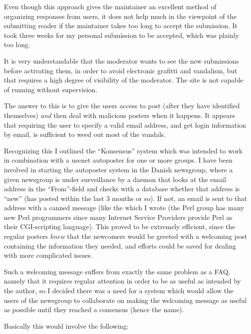 Even though this approach gives the maintainer an excellent method of
organizing responses from users, it does not help much in the
viewpoint of the submitting reader if the maintainer takes too long to
accept the submission.  It took three weeks for my personal
submission to be accepted, which was plainly too long.

It is very understandable that the moderator wants to see the new
submissions before activating them, in order to avoid electronic
grafitti and vandalism, but that requires a high degree of visibility
of the moderator.  The site is not capable of running without
supervision.

The answer to this is to give the users access to post (after they
have identified themselves) \textit{and} then deal with malicious
posters when it happens.  It appears that requiring the user to
specify a valid email address, and get login information by email, is
sufficient to weed out most of the vandals.

Recognizing this I outlined the ``Konsensus'' system which was
intended to work in combination with a usenet autoposter for one or
more groups.  I have been involved in starting the autoposter system
in the Danish newsgroup, where a given newsgroup is under surveillance
by a daemon that looks at the email address in the ``From''-field and
checks with a database whether that address is ``new'' (has posted
within the last 3 months or so).  If not, an email is sent to that
address with a canned message (like the
 which I wrote (the Perl group has many new Perl programmers
since many Internet Service Providers provide Perl as their
CGI-scripting language).  This proved to be extremely efficient, since
the regular posters \textit{knew} that the newcomers would be greeted
with a welcoming post containing the information they needed, and
efforts could be saved for dealing with more complicated issues.

Such a welcoming message suffers from exactly the same problem as a
FAQ, namely that it requires regular attention in order to be as
useful as intended by the author, so I decided there was a need for a
system which would allow the users of the newsgroup to collaborate on
making the welcoming message as useful as possible until they reached
a consensus (hence the name).

Basically this would involve the following:


